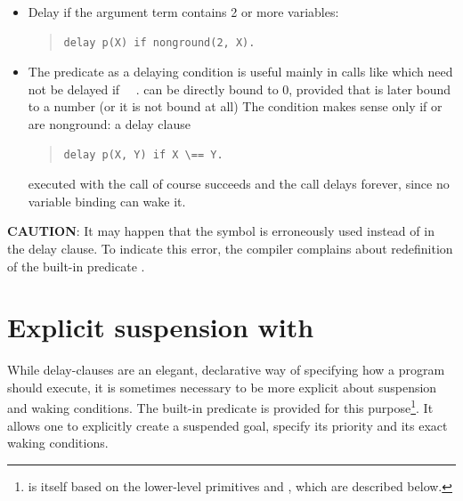{\begin{itemize}
\item
Delay if the argument term contains 2 or more variables:
\begin{quote}
\begin{verbatim}
delay p(X) if nonground(2, X).
\end{verbatim}
\end{quote}

\item
The
predicate as a delaying condition is useful mainly
in calls like  which need not be delayed if
~\notation{==}~.
 can be directly bound to 0, provided that  is later bound to
a number
(or it is not bound at all)
The condition  makes sense
only if  or  are nonground: a delay clause
\begin{quote}
\begin{verbatim}
delay p(X, Y) if X \== Y.
\end{verbatim}
\end{quote}
executed with the call  of course succeeds and the call
delays
forever, since no variable binding can wake it.
\end{itemize}

\textbf{CAUTION}: It may happen that the symbol \notation{:-} is erroneously
used instead of  in the delay clause. To indicate this error,
the compiler complains about redefinition of the built-in predicate
.


\section{Explicit suspension with }
\label{suspend3}
While delay-clauses are an elegant, declarative way of specifying how
a program should execute, it is sometimes necessary to be more explicit
about suspension and waking conditions.
The built-in predicate
is provided for this purpose\footnote{
 is itself based on the lower-level primitives
and , which are described below.}.
It allows one to explicitly create a suspended goal, specify its priority
and its exact waking conditions.

}
